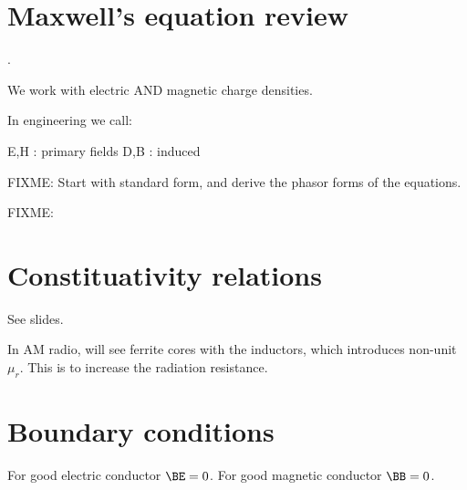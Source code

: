 
\section{Maxwell's equation review}.

We work with electric AND magnetic charge densities.

In engineering we call:

E,H : primary fields
D,B : induced

FIXME: Start with standard form, and derive the phasor forms of the equations.


FIXME: 
\section{Constituativity relations}

See slides.

In AM radio, will see ferrite cores with the inductors, which introduces non-unit \( \mu_r \).  This is to increase the radiation resistance.

\section{Boundary conditions}

For good electric conductor \( \BE = 0 \).
For good magnetic conductor \( \BB = 0 \).


